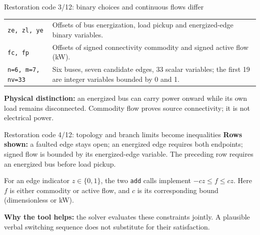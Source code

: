 \begin{frame}[t]{Restoration code 3/12: binary choices and continuous flows differ}
\deepdive
{}
\footnotesize
\begin{tabular}{@{}>{\raggedright\arraybackslash}p{.32\linewidth}>{\raggedright\arraybackslash}p{.60\linewidth}@{}}
\texttt{ze, zl, ye} & Offsets of bus energization, load pickup and energized-edge binary variables. \\
\texttt{fc, fp} & Offsets of signed connectivity commodity and signed active flow (kW). \\
\texttt{n=6, m=7, nv=33} & Six buses, seven candidate edges, 33 scalar variables; the first 19 are integer variables bounded by 0 and 1. \\
\end{tabular}
\par\smallskip\textbf{Physical distinction:} an energized bus can carry power onward while its own load remains disconnected. Commodity flow proves source connectivity; it is not electrical power.
\end{frame}

\begin{frame}[t]{Restoration code 4/12: topology and branch limits become inequalities}
\deepdive
{}
\footnotesize
\textbf{Rows shown:} a faulted edge stays open; an energized edge requires both endpoints; signed flow is bounded by its energized-edge variable. The preceding row requires an energized bus before load pickup.
\par\smallskip For an edge indicator $z\in\{0,1\}$, the two \texttt{add} calls implement $-cz\leq f\leq cz$. Here $f$ is either commodity or active flow, and $c$ is its corresponding bound (dimensionless or kW).
\par\smallskip\textbf{Why the tool helps:} the solver evaluates these constraints jointly. A plausible verbal switching sequence does not substitute for their satisfaction.
\end{frame}

